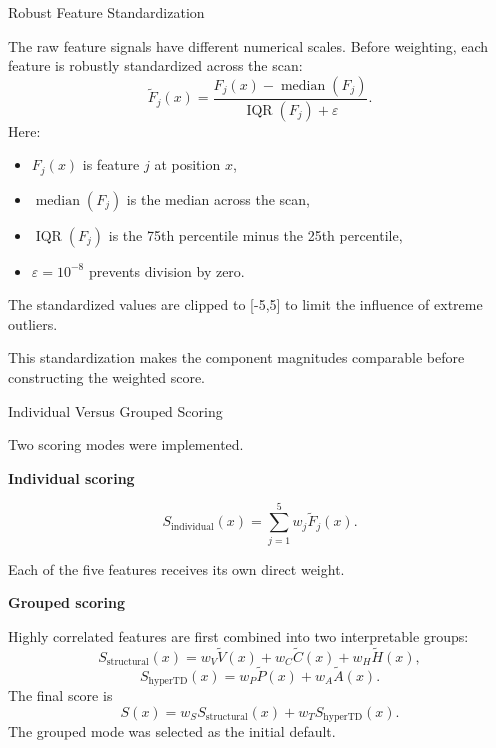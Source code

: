 \documentclass[aspectratio=169]{beamer}
\begin{document}
\begin{frame}{Robust Feature Standardization}

The raw feature signals have different numerical scales. Before weighting,
each feature is robustly standardized across the scan:
\[
\widetilde F_j(x)
=
\frac{
F_j(x)-\operatorname{median}(F_j)
}{
\operatorname{IQR}(F_j)+\varepsilon
}.
\]
Here:
\begin{itemize}
    \item \(F_j(x)\) is feature \(j\) at position \(x\),
    \item \(\operatorname{median}(F_j)\) is the median across the scan,
    \item \(\operatorname{IQR}(F_j)\) is the 75th percentile minus the 25th
    percentile,
    \item \(\varepsilon=10^{-8}\) prevents division by zero.
\end{itemize}
The standardized values are clipped to [-5,5] to limit the influence of extreme outliers.

\vspace{0.3cm}

This standardization makes the component magnitudes comparable before
constructing the weighted score.

\end{frame}

\begin{frame}{Individual Versus Grouped Scoring}

Two scoring modes were implemented.

\vspace{0.2cm}

\textbf{Individual scoring}

\[
S_{\mathrm{individual}}(x)
=
\sum_{j=1}^{5}
w_j\widetilde F_j(x).
\]

Each of the five features receives its own direct weight.

\vspace{0.3cm}

\textbf{Grouped scoring}

Highly correlated features are first combined into two interpretable groups:
\[
S_{\mathrm{structural}}(x)
=
w_V\widetilde V(x)
+
w_C\widetilde C(x)
+
w_H\widetilde H(x),
\]
\[
S_{\mathrm{hyperTD}}(x)
=
w_P\widetilde P(x)
+
w_A\widetilde A(x).
\]
The final score is
\[
S(x)
=
w_S S_{\mathrm{structural}}(x)
+
w_T S_{\mathrm{hyperTD}}(x).
\]
The grouped mode was selected as the initial default.

\end{frame}
\end{document}
